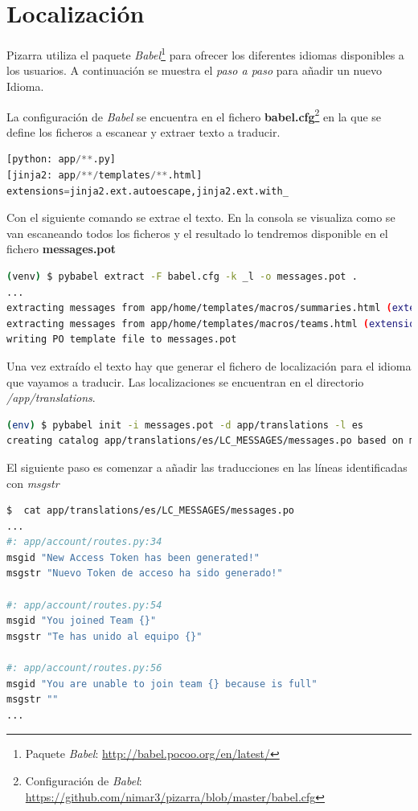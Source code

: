 \documentclass[11pt,spanish,listoffigures,listoftables]{tfgetsinf}
\begin{document}
\section{Localización}

Pizarra utiliza el \Gls{paquete} \textit{Babel}\footnote{Paquete \textit{Babel}: \url{http://babel.pocoo.org/en/latest/}} para ofrecer los diferentes idiomas disponibles a los usuarios. A continuación se muestra el \textit{paso a paso} para añadir un nuevo Idioma.

La configuración de \textit{Babel} se encuentra en el fichero \textbf{babel.cfg}\footnote{Configuración de \textit{Babel}: \url{https://github.com/nimar3/pizarra/blob/master/babel.cfg}} en la que se define los ficheros a escanear y extraer texto a traducir.

\begin{lstlisting}[language=python]
[python: app/**.py]
[jinja2: app/**/templates/**.html]
extensions=jinja2.ext.autoescape,jinja2.ext.with_
\end{lstlisting}

Con el siguiente comando se extrae el texto. En la consola se visualiza como se van escaneando todos los ficheros y el resultado lo tendremos disponible en el fichero \mbox{\textbf{messages.pot}} 

\begin{lstlisting}[language=bash]
(venv) $ pybabel extract -F babel.cfg -k _l -o messages.pot .
...
extracting messages from app/home/templates/macros/summaries.html (extensions="jinja2.ext.autoescape,jinja2.ext.with_")
extracting messages from app/home/templates/macros/teams.html (extensions="jinja2.ext.autoescape,jinja2.ext.with_")
writing PO template file to messages.pot
\end{lstlisting}

Una vez extraído el texto hay que generar el fichero de localización para el idioma que vayamos a traducir. Las localizaciones se encuentran en el directorio \textit{/app/translations}. 

\begin{lstlisting}[language=bash]
(env) $ pybabel init -i messages.pot -d app/translations -l es
creating catalog app/translations/es/LC_MESSAGES/messages.po based on messages.pot
\end{lstlisting}

El siguiente paso es comenzar a añadir las traducciones en las líneas identificadas con \textit{msgstr}

\begin{lstlisting}[language=bash]
$  cat app/translations/es/LC_MESSAGES/messages.po
...
#: app/account/routes.py:34
msgid "New Access Token has been generated!"
msgstr "Nuevo Token de acceso ha sido generado!"

#: app/account/routes.py:54
msgid "You joined Team {}"
msgstr "Te has unido al equipo {}"

#: app/account/routes.py:56
msgid "You are unable to join team {} because is full"
msgstr ""
...
\end{lstlisting}
\end{document}

